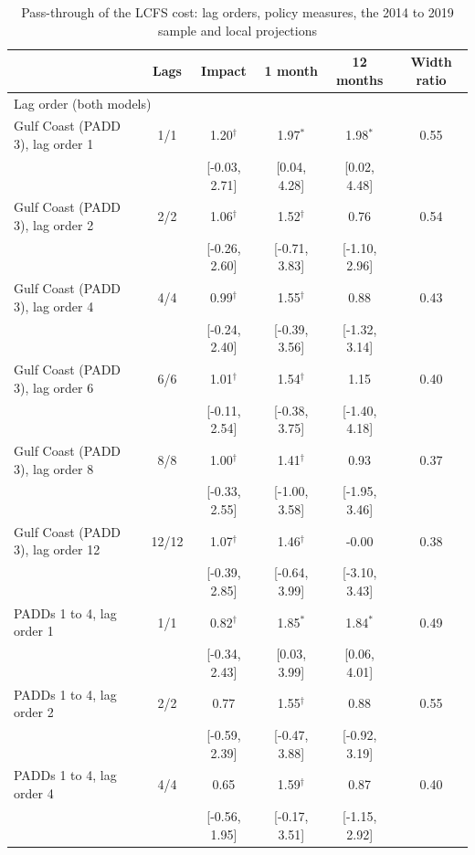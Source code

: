 \begin{table}[htbp]
\centering
\caption{Pass-through of the LCFS cost: lag orders, policy measures, the 2014 to 2019 sample and local projections}
\label{tab:california_appendix}
\small
\begin{tabular}{lccccc}
\toprule
 & Lags & Impact & 1 month & 12 months & Width ratio \\
\midrule
\multicolumn{6}{l}{Lag order (both models)} \\
\midrule
Gulf Coast (PADD 3), lag order 1 & 1/1 & 1.20$^{\dagger}$ & 1.97$^{*}$ & 1.98$^{*}$ & 0.55 \\
\footnotesize  &  & [-0.03, 2.71] & [0.04, 4.28] & [0.02, 4.48] &  \\[2pt]
Gulf Coast (PADD 3), lag order 2 & 2/2 & 1.06$^{\dagger}$ & 1.52$^{\dagger}$ & 0.76 & 0.54 \\
\footnotesize  &  & [-0.26, 2.60] & [-0.71, 3.83] & [-1.10, 2.96] &  \\[2pt]
Gulf Coast (PADD 3), lag order 4 & 4/4 & 0.99$^{\dagger}$ & 1.55$^{\dagger}$ & 0.88 & 0.43 \\
\footnotesize  &  & [-0.24, 2.40] & [-0.39, 3.56] & [-1.32, 3.14] &  \\[2pt]
Gulf Coast (PADD 3), lag order 6 & 6/6 & 1.01$^{\dagger}$ & 1.54$^{\dagger}$ & 1.15 & 0.40 \\
\footnotesize  &  & [-0.11, 2.54] & [-0.38, 3.75] & [-1.40, 4.18] &  \\[2pt]
Gulf Coast (PADD 3), lag order 8 & 8/8 & 1.00$^{\dagger}$ & 1.41$^{\dagger}$ & 0.93 & 0.37 \\
\footnotesize  &  & [-0.33, 2.55] & [-1.00, 3.58] & [-1.95, 3.46] &  \\[2pt]
Gulf Coast (PADD 3), lag order 12 & 12/12 & 1.07$^{\dagger}$ & 1.46$^{\dagger}$ & -0.00 & 0.38 \\
\footnotesize  &  & [-0.39, 2.85] & [-0.64, 3.99] & [-3.10, 3.43] &  \\[2pt]
PADDs 1 to 4, lag order 1 & 1/1 & 0.82$^{\dagger}$ & 1.85$^{*}$ & 1.84$^{*}$ & 0.49 \\
\footnotesize  &  & [-0.34, 2.43] & [0.03, 3.99] & [0.06, 4.01] &  \\[2pt]
PADDs 1 to 4, lag order 2 & 2/2 & 0.77 & 1.55$^{\dagger}$ & 0.88 & 0.55 \\
\footnotesize  &  & [-0.59, 2.39] & [-0.47, 3.88] & [-0.92, 3.19] &  \\[2pt]
PADDs 1 to 4, lag order 4 & 4/4 & 0.65 & 1.59$^{\dagger}$ & 0.87 & 0.40 \\
\footnotesize  &  & [-0.56, 1.95] & [-0.17, 3.51] & [-1.15, 2.92] &  \\[2pt]

\end{tabular}
\end{table}
